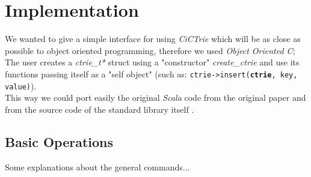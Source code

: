 \documentclass[conference]{IEEEtran}
\begin{document}
\section{Implementation}
	
	We wanted to give a simple interface for using \textit{CiCTrie} which will be as close  as possible to object oriented programming, therefore we used \textit{Object Oriented C}; The user creates a \textit{ctrie\_t*} struct using a "constructor" \textit{create\_ctrie} and use its functions passing itself as a "self object" (such as: \texttt{ctrie->insert(\textbf{ctrie}, key, value)}). \\
	This way we could port easily the original \textit{Scala} code from the original paper \cite{article} and from the source code of the standard library itself \cite{ctrie-scala-source-code}. \\
	
\subsection{Basic Operations}
	Some explanations about the general commands...
	
\end{document}
